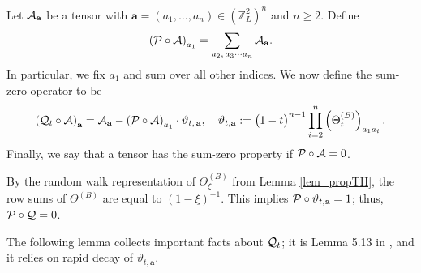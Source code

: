 \begin{definition}\label{Def:QtPt} Let ${\cal A}_\textbf{a}$ be a tensor with $\textbf{a}=(a_{1},\ldots,a_{n})\in (\mathbb Z_L^2)^n$ and $n\ge 2$. Define
$$
\left( {\cal P} \circ {\cal A}\right)_{a_1}= \sum_{a_2,\, a_3\cdots a_n}  {\cal A}_{\textbf{a}}. 
$$
In particular, we fix $a_{1}$ and sum over all other indices. We now define the sum-zero operator to be
$$
 \left({\cal Q}_t\circ {\cal A}\right)_{\textbf{a}}={\cal A}_{\textbf{a}}-\left({\cal P} \circ {\cal A}\right)_{a_1}
 \cdot {  \vartheta}_{t,\,\textbf{a}},\quad 
 {  \vartheta}_{t, \textbf{a}}:=\big(1-t\big)^{n-1}\prod_{i=2}^n \left(\Theta^{(B)}_t\right)_{a_1a_i}.$$
 Finally, we say that a tensor has the sum-zero property if ${\cal P}\circ{\cal A}=0$.
\end{definition}
By the random walk representation of $\Theta_{\xi}^{(B)}$ from Lemma \ref{lem_propTH}, the row sums of $\Theta^{(B)}$ are equal to $(1-\xi)^{-1}$. This implies ${\cal P}\circ\vartheta_{t,\textbf{a}}=1$; thus, ${\cal P}\circ{\cal Q}=0$. 

The following lemma collects important facts about ${\cal Q}_{t}$; it is Lemma 5.13 in \cite{YY_25}, and it relies on rapid decay of $\vartheta_{t,\textbf{a}}$.


